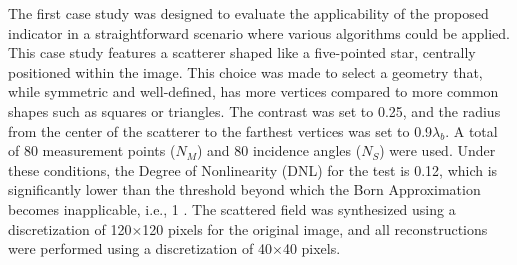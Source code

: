 \documentclass{IEEEtran}
\begin{document}

                The first case study was designed to evaluate the applicability of the proposed indicator in a straightforward scenario where various algorithms could be applied. This case study features a scatterer shaped like a five-pointed star, centrally positioned within the image. This choice was made to select a geometry that, while symmetric and well-defined, has more vertices compared to more common shapes such as squares or triangles. The contrast was set to 0.25, and the radius from the center of the scatterer to the farthest vertices was set to 0.9$\lambda_b$. A total of 80 measurement points ($N_M$) and 80 incidence angles ($N_S$) were used. Under these conditions, the Degree of Nonlinearity (DNL) for the test is 0.12, which is significantly lower than the threshold beyond which the Born Approximation becomes inapplicable, i.e., 1 \cite{bucci2001degree}. The scattered field was synthesized using a discretization of 120$\times$120 pixels for the original image, and all reconstructions were performed using a discretization of 40$\times$40 pixels.
\end{document}
